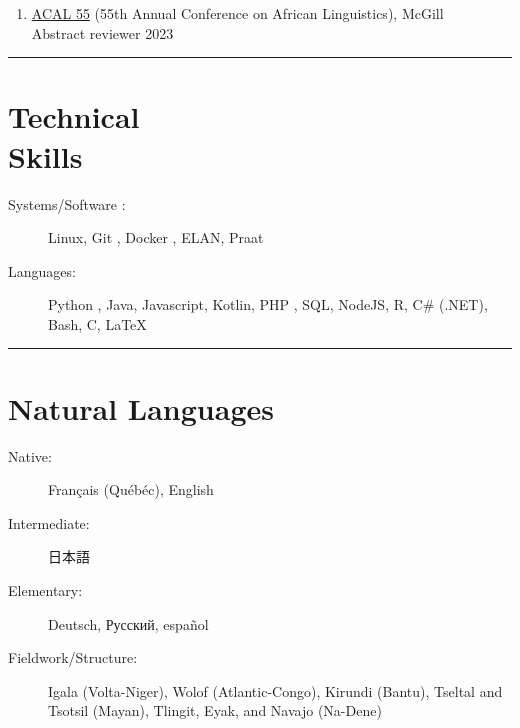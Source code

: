 \documentclass[margin,line]{resume}
\begin{document}
\begin{resume}
\begin{enumerate}[-, leftmargin=1em, topsep=2pt]
		\item[] \href{https://acal55.mull-lab.org/}{ACAL 55} (55th Annual Conference on African Linguistics), McGill\\
		      \hphantom{...}Abstract reviewer \hfill 2023
	\end{enumerate}

	\vspace{-0.9em}\rule{\textwidth}{0.4pt}


	\vspace{-1em}

	\section{\mysidestyle Technical\\Skills}\vspace{2mm}
	\begin{description}
		\item[Systems/Software%
		:] Linux, Git%
		      , Docker%
		      , ELAN, Praat%
		\item[Languages:] Python%
		      , Java, Javascript, Kotlin, PHP%
		      , SQL, NodeJS, R, C\# (.NET),
		      Bash, 
			  C, \LaTeX
	\end{description}

	\vspace{-2em}\rule{\textwidth}{0.4pt}



	\vspace{-0.9em}

	\section{\mysidestyle Natural Languages}\vspace{2mm}
	\begin{description}
		\item[Native:] Français (Qu\'{e}b\'{e}c), English
		\item[Intermediate:] \begin{CJK}{UTF8}{min}日本語\end{CJK}
		\item[Elementary:] Deutsch, Русский, español
		\item[Fieldwork/Structure:] Igala (Volta-Niger), Wolof (Atlantic-Congo), Kirundi (Bantu),
		      Tseltal and Tsotsil (Mayan), Tlingit, Eyak, and Navajo (Na-Dene)%
	\end{description}

	\BgThispage

\end{resume}
\end{document}
